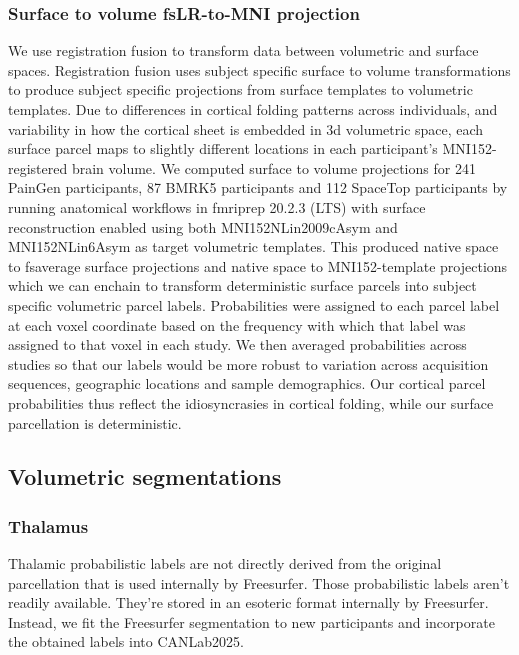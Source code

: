 \documentclass[10pt,letterpaper]{article}
\begin{document}
\subsubsection{Surface to volume fsLR-to-MNI projection} We use registration fusion  to transform data between volumetric and surface spaces. Registration fusion uses subject specific surface to volume transformations to produce subject specific projections from surface templates to volumetric templates. Due to differences in cortical folding patterns across individuals, and variability in how the cortical sheet is embedded in 3d volumetric space, each surface parcel maps to slightly different locations in each participant's MNI152-registered brain volume. We computed surface to volume projections for 241 PainGen participants, 87 BMRK5 participants and 112 SpaceTop participants by running anatomical workflows in fmriprep 20.2.3 (LTS) with surface reconstruction enabled using both MNI152NLin2009cAsym and MNI152NLin6Asym as target volumetric templates. This produced native space to fsaverage surface projections and native space to MNI152-template projections which we can enchain to transform deterministic surface parcels into subject specific volumetric parcel labels. Probabilities were assigned to each parcel label at each voxel coordinate based on the frequency with which that label was assigned to that voxel in each study. We then averaged probabilities across studies so that our labels would be more robust to variation across acquisition sequences, geographic locations and sample demographics. Our cortical parcel probabilities thus reflect the idiosyncrasies in cortical folding, while our surface parcellation is deterministic. 

\subsection{Volumetric segmentations}

\subsubsection{Thalamus} Thalamic probabilistic labels are not directly derived from the original parcellation  that is used internally by Freesurfer. Those probabilistic labels aren't readily available. They're stored in an esoteric format internally by Freesurfer. Instead, we fit the Freesurfer segmentation to new participants and incorporate the obtained labels into CANLab2025.
\end{document}
